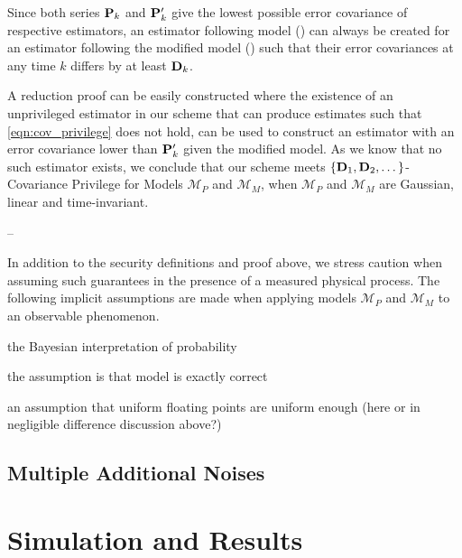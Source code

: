 \documentclass[conference]{IEEEtran}
\theoremstyle{definition}
\theoremstyle{definition}
\theoremstyle{remark}
\begin{document}
Since both series ${{\mathbf{P}}}_k$ and ${{\mathbf{P}}}^\prime_k$ give the lowest possible error covariance of respective estimators, an estimator following model () can always be created for an estimator following the modified model () such that their error covariances at any time $k$ differs by at least ${{\mathbf{D}}}_k$.

A reduction proof can be easily constructed where the existence of an unprivileged estimator in our scheme that can produce estimates such that \eqref{eqn:cov_privilege} does not hold, can be used to construct an estimator with an error covariance lower than ${{\mathbf{P}}}^\prime_k$ given the modified model. As we know that no such estimator exists, we conclude that our scheme meets $\{{{\mathbf{D}}}_1,{{\mathbf{D}}}_2,\dots\}$-Covariance Privilege for Models $\mathcal{M}_P$ and $\mathcal{M}_M$, when $\mathcal{M}_P$ and $\mathcal{M}_M$ are Gaussian, linear and time-invariant.

--

In addition to the security definitions and proof above, we stress caution when assuming such guarantees in the presence of a measured physical process. The following implicit assumptions are made when applying models $\mathcal{M}_P$ and $\mathcal{M}_M$ to an observable phenomenon.

the Bayesian interpretation of probability

the assumption is that model is exactly correct

an assumption that uniform floating points are uniform enough (here or in negligible difference discussion above?)

\subsection{Multiple Additional Noises}


% 
%                                 
%                                 
%                                 
% 

\section{Simulation and Results}
\end{document}
